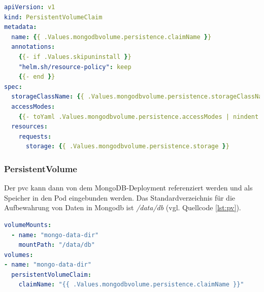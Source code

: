 \begin{lstlisting}[caption={pvc-claim.yaml },captionpos=b,label={lst:pvc},language=yaml]
apiVersion: v1
kind: PersistentVolumeClaim
metadata:
  name: {{ .Values.mongodbvolume.persistence.claimName }}
  annotations:
    {{- if .Values.skipuninstall }}
    "helm.sh/resource-policy": keep
    {{- end }}
spec:
  storageClassName: {{ .Values.mongodbvolume.persistence.storageClassName }}
  accessModes:
    {{- toYaml .Values.mongodbvolume.persistence.accessModes | nindent 4  }}
  resources:
    requests:
      storage: {{ .Values.mongodbvolume.persistence.storage }}
\end{lstlisting}


\subsubsection{PersistentVolume}

Der \acs{pvc} kann dann von dem MongoDB-Deployment referenziert werden 
und als Speicher in den Pod eingebunden werden. 
Das Standardverzeichnis für die Aufbewahrung von Daten in Mongodb ist \textit{/data/db} \cite{mongodbpath} (vgl. Quellcode \ref{lst:pv}).

\begin{lstlisting}[caption={Ausschnitt aus dem mongodb-deployment.yaml },captionpos=b,label={lst:pv},language=yaml]
  volumeMounts:
  - name: "mongo-data-dir"
    mountPath: "/data/db"
volumes:
- name: "mongo-data-dir"
  persistentVolumeClaim:
    claimName: "{{ .Values.mongodbvolume.persistence.claimName }}"
\end{lstlisting}
